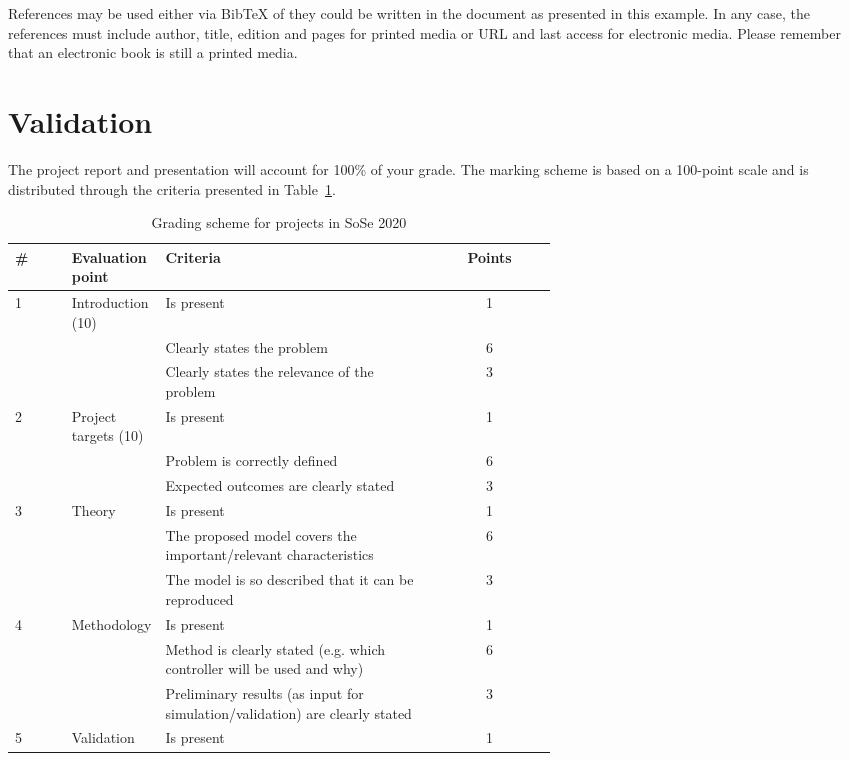 	References may be used either via BibTeX of they could be written in the document as presented in this example. In any case, the references must include author, title, edition and pages for printed media or URL and last access for electronic media. Please remember that an electronic book is still a printed media.
	
	\section{Validation}
	
	The project report and presentation will account for 100\% of your grade. The marking scheme is based on a 100-point scale and is distributed through the criteria presented in Table~\ref{tbl:grading}.
	
	\begin{table}[h]
		\caption{Grading scheme for projects in SoSe 2020}\label{tbl:grading}
		\centering
		\begin{tabular}{l p{0.13\linewidth} p{0.5\linewidth} c}
			\hline
			\bfseries \# & \bfseries Evaluation point & \bfseries Criteria & \bfseries Points \\
			\hline
			1 & Introduction (10) & Is present & 1 \\
			\cline{3-4}
			 & & Clearly states the problem & 6 \\
			 \cline{3-4}
			 & & Clearly states the relevance of the problem & 3\\
			 \hline
			 2 & Project targets (10) & Is present & 1 \\
			 \cline{3-4}
			 & & Problem is correctly defined & 6 \\
			\cline{3-4}
			 & & Expected outcomes are clearly stated & 3 \\
			 \hline
			 3 & Theory & Is present & 1 \\
			\cline{3-4}
			 & & The proposed model covers the important/relevant characteristics & 6 \\
			\cline{3-4}
			 & & The model is so described that it can be reproduced & 3\\
			 \hline
			 4 & Methodology & Is present & 1 \\
			\cline{3-4}
			 & & Method is clearly stated (e.g. which controller will be used and why) & 6 \\
			\cline{3-4}
			 & & Preliminary results (as input for simulation/validation) are clearly stated & 3\\
			 \hline
			 5 & Validation & Is present & 1 \\

\end{tabular}
\end{table}
